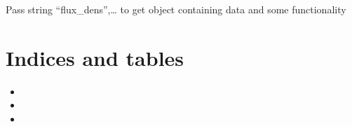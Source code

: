 \documentclass[letterpaper,10pt,english]{sphinxmanual}
\begin{document}
\begin{fulllineitems}
\begin{fulllineitems}
\end{fulllineitems}


\begin{fulllineitems}
\label{\detokenize{autoapi/unduwave/index:unduwave.wave_results.get_result}}
\pysigstartsignatures
{}
\pysigstopsignatures
\sphinxAtStartPar
Pass string “flux\_dens”,… to get object containing data and some functionality

\end{fulllineitems}


\end{fulllineitems}



\chapter{Indices and tables}
\label{\detokenize{index:indices-and-tables}}\begin{itemize}
\item {} 
\sphinxAtStartPar
{}

\item {} 
\sphinxAtStartPar
{}

\item {} 
\sphinxAtStartPar
{}

\end{itemize}
\end{document}
